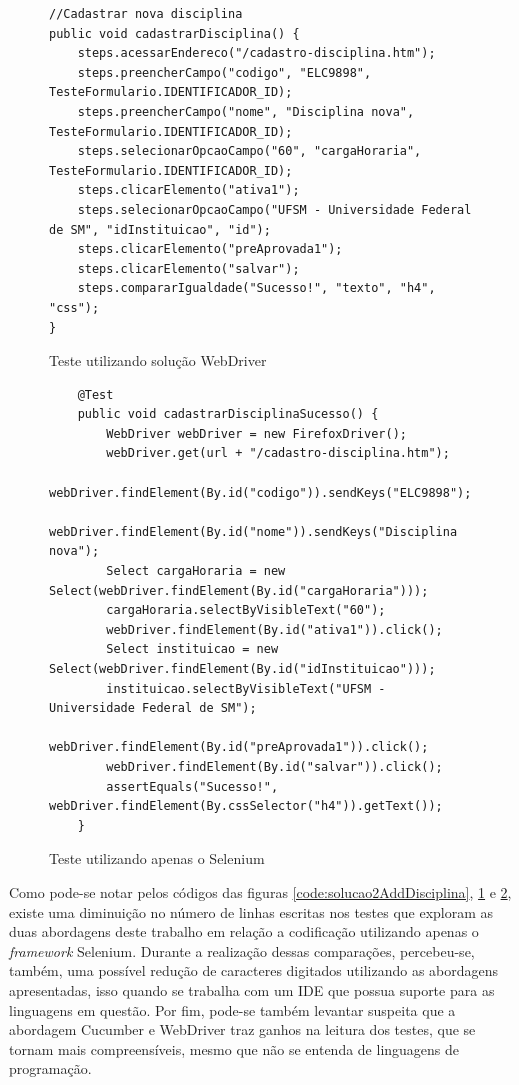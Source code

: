 \documentclass[tg]{mdtufsm}
\begin{document}
\begin{figure}[!htt]
	\begin{lstlisting}
//Cadastrar nova disciplina
public void cadastrarDisciplina() {
    steps.acessarEndereco("/cadastro-disciplina.htm");
    steps.preencherCampo("codigo", "ELC9898", TesteFormulario.IDENTIFICADOR_ID);
    steps.preencherCampo("nome", "Disciplina nova", TesteFormulario.IDENTIFICADOR_ID);
    steps.selecionarOpcaoCampo("60", "cargaHoraria", TesteFormulario.IDENTIFICADOR_ID);
    steps.clicarElemento("ativa1");
    steps.selecionarOpcaoCampo("UFSM - Universidade Federal de SM", "idInstituicao", "id");
    steps.clicarElemento("preAprovada1");
    steps.clicarElemento("salvar");
    steps.compararIgualdade("Sucesso!", "texto", "h4", "css");
}
	\end{lstlisting}
	\caption{Teste utilizando solução WebDriver}
	\label{code:solucao3AddDisciplina}
\end{figure}

\begin{figure}[!htt]
	\begin{lstlisting}
	@Test
	public void cadastrarDisciplinaSucesso() {
		WebDriver webDriver = new FirefoxDriver();
		webDriver.get(url + "/cadastro-disciplina.htm");
		webDriver.findElement(By.id("codigo")).sendKeys("ELC9898");
		webDriver.findElement(By.id("nome")).sendKeys("Disciplina nova");
		Select cargaHoraria = new Select(webDriver.findElement(By.id("cargaHoraria")));
		cargaHoraria.selectByVisibleText("60");
		webDriver.findElement(By.id("ativa1")).click();
		Select instituicao = new Select(webDriver.findElement(By.id("idInstituicao")));
		instituicao.selectByVisibleText("UFSM - Universidade Federal de SM");
		webDriver.findElement(By.id("preAprovada1")).click();
		webDriver.findElement(By.id("salvar")).click();
		assertEquals("Sucesso!", webDriver.findElement(By.cssSelector("h4")).getText());
	}
	\end{lstlisting}
	\caption{Teste utilizando apenas o Selenium}
	\label{code:seleniumAddDisciplina}
\end{figure}

Como pode-se notar pelos códigos das figuras \ref{code:solucao2AddDisciplina}, \ref{code:solucao3AddDisciplina} e \ref{code:seleniumAddDisciplina}, existe uma diminuição no número de linhas
escritas nos testes que exploram as duas abordagens deste trabalho em relação a codificação utilizando apenas o \emph{framework} Selenium. Durante a realização dessas comparações, percebeu-se, também, uma possível redução de caracteres digitados utilizando as abordagens apresentadas, isso quando se trabalha com um IDE que possua suporte para as linguagens em questão. Por fim, pode-se também levantar suspeita que a abordagem Cucumber e WebDriver traz ganhos na leitura dos testes, que se tornam mais
compreensíveis, mesmo que não se entenda de linguagens de programação.
\end{document}
